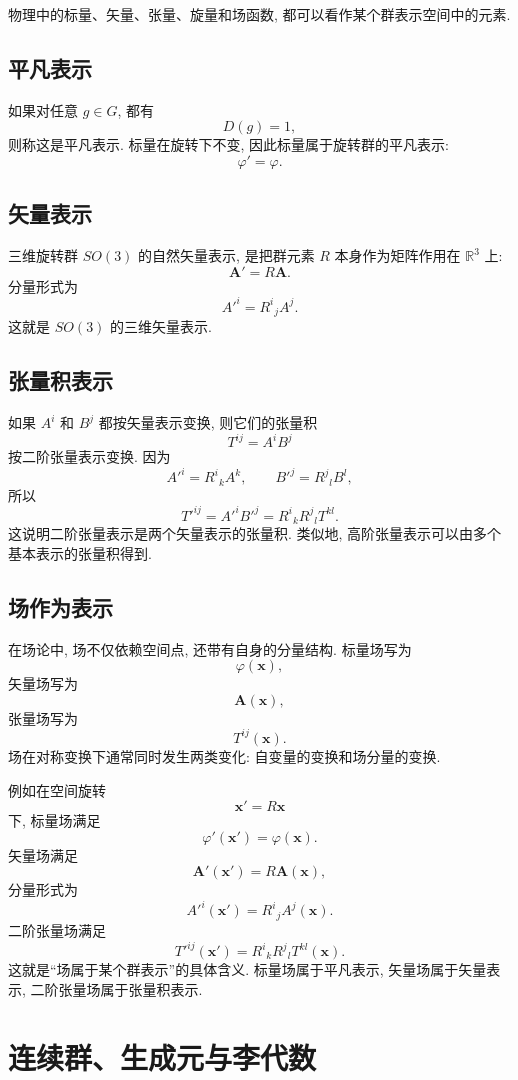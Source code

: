 物理中的标量、矢量、张量、旋量和场函数, 都可以看作某个群表示空间中的元素. 

\subsection{平凡表示}

如果对任意 $g\in G$, 都有
\[
D(g)=1,
\]
则称这是平凡表示. 标量在旋转下不变, 因此标量属于旋转群的平凡表示: 
\[
\varphi'=\varphi.
\]

\subsection{矢量表示}

三维旋转群 $SO(3)$ 的自然矢量表示, 是把群元素 $R$ 本身作为矩阵作用在 $\mathbb{R}^3$ 上: 
\[
\bm{A}'=R\bm{A}.
\]
分量形式为
\[
A'^i=R^i{}_jA^j.
\]
这就是 $SO(3)$ 的三维矢量表示. 

\subsection{张量积表示}

如果 $A^i$ 和 $B^j$ 都按矢量表示变换, 则它们的张量积
\[
T^{ij}=A^iB^j
\]
按二阶张量表示变换. 因为
\[
A'^i=R^i{}_kA^k,
\qquad
B'^j=R^j{}_lB^l,
\]
所以
\[
T'^{ij}
=
A'^iB'^j
=
R^i{}_kR^j{}_lT^{kl}.
\]
这说明二阶张量表示是两个矢量表示的张量积. 类似地, 高阶张量表示可以由多个基本表示的张量积得到. 

\subsection{场作为表示}

在场论中, 场不仅依赖空间点, 还带有自身的分量结构. 标量场写为
\[
\varphi(\bm{x}),
\]
矢量场写为
\[
\bm{A}(\bm{x}),
\]
张量场写为
\[
T^{ij}(\bm{x}).
\]
场在对称变换下通常同时发生两类变化: 自变量的变换和场分量的变换. 

例如在空间旋转
\[
\bm{x}'=R\bm{x}
\]
下, 标量场满足
\[
\varphi'(\bm{x}')=\varphi(\bm{x}).
\]
矢量场满足
\[
\bm{A}'(\bm{x}')=R\bm{A}(\bm{x}),
\]
分量形式为
\[
A'^i(\bm{x}')=R^i{}_jA^j(\bm{x}).
\]
二阶张量场满足
\[
T'^{ij}(\bm{x}')
=
R^i{}_kR^j{}_lT^{kl}(\bm{x}).
\]
这就是“场属于某个群表示”的具体含义. 标量场属于平凡表示, 矢量场属于矢量表示, 二阶张量场属于张量积表示. 

\section{连续群、生成元与李代数}

